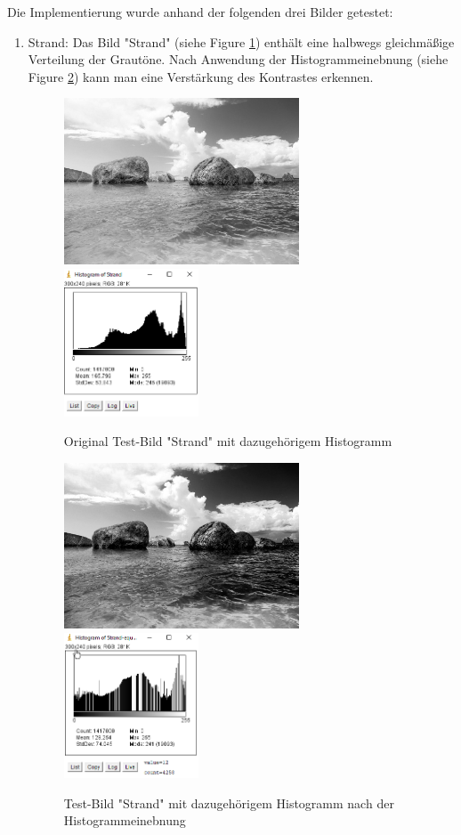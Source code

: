 \documentclass[12pt,german]{article}
\begin{document}
Die Implementierung wurde anhand der folgenden drei Bilder getestet:
\begin{enumerate}
\item Strand: 
Das Bild "Strand" (siehe Figure \ref{fig:Strand01}) enthält eine halbwegs gleichmäßige Verteilung der Grautöne. Nach Anwendung der Histogrammeinebnung  (siehe Figure \ref{fig:Strand02}) kann man eine Verstärkung des Kontrastes erkennen.
\begin{figure}[H] \centering
	\includegraphics[width=7cm]{../testData/Results/Strand/Strand.jpg}
	\includegraphics[width=4cm]{../testData/Results/Strand/Strand-histogram.png}
	\caption{Original Test-Bild "Strand" mit dazugehörigem Histogramm}
	 \label{fig:Strand01}
\end{figure}
\begin{figure}[H] \centering
	\includegraphics[width=7cm]{../testData/Results/Strand/Strand-equalized.jpg}
	\includegraphics[width=4cm]{../testData/Results/Strand/Strand-equalized-histogram.png}
	\caption{Test-Bild "Strand" mit dazugehörigem Histogramm nach der Histogrammeinebnung}
	 \label{fig:Strand02}
\end{figure}


\end{enumerate}
\end{document}
